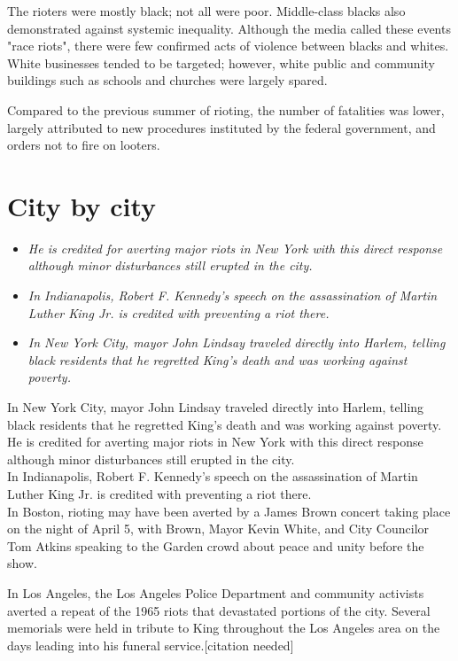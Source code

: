 The rioters were mostly black; not all were poor. Middle-class blacks
also demonstrated against systemic inequality. Although the media called
these events "race riots", there were few confirmed acts of violence
between blacks and whites. White businesses tended to be targeted;
however, white public and community buildings such as schools and
churches were largely spared.

Compared to the previous summer of rioting, the number of fatalities was
lower, largely attributed to new procedures instituted by the federal
government, and orders not to fire on looters.

\section{City by city}\label{city-by-city}

\begin{itemize}
\item
  \emph{He is credited for averting major riots in New York with this
  direct response although minor disturbances still erupted in the
  city.}
\item
  \emph{In Indianapolis, Robert F. Kennedy's speech on the assassination
  of Martin Luther King Jr. is credited with preventing a riot there.}
\item
  \emph{In New York City, mayor John Lindsay traveled directly into
  Harlem, telling black residents that he regretted King's death and was
  working against poverty.}
\end{itemize}

In New York City, mayor John Lindsay traveled directly into Harlem,
telling black residents that he regretted King's death and was working
against poverty. He is credited for averting major riots in New York
with this direct response although minor disturbances still erupted in
the city.\\
In Indianapolis, Robert F. Kennedy's speech on the assassination of
Martin Luther King Jr. is credited with preventing a riot there.\\
In Boston, rioting may have been averted by a James Brown concert taking
place on the night of April 5, with Brown, Mayor Kevin White, and City
Councilor Tom Atkins speaking to the Garden crowd about peace and unity
before the show.

In Los Angeles, the Los Angeles Police Department and community
activists averted a repeat of the 1965 riots that devastated portions of
the city. Several memorials were held in tribute to King throughout the
Los Angeles area on the days leading into his funeral
service.{[}citation needed{]}

